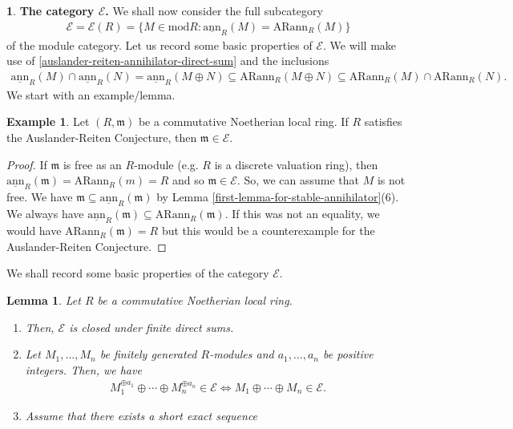 \documentclass[12pt]{amsart}
\newcommand{\sann}{\underline{\mathrm{ann}}}
\newcommand{\arann}{\mathrm{ARann}}
\newcommand{\m}{\mathfrak{m}}
\newcommand{\module}{\mathrm{mod}}
\newcommand{\EE}{\mathcal{E}}
\newtheorem{lemma}[theorem]{Lemma}
\theoremstyle{definition}
\newtheorem{example}[theorem]{Example}
\newtheorem{chunk}[theorem]{}
\numberwithin{equation}{theorem}
\begin{document}
\begin{chunk}
    \textbf{The category $\EE$.} We shall now consider the full subcategory
    \begin{align*}
        \EE = \EE(R) = \{M \in \module R \colon \sann_R(M) = \arann_R(M) \}
    \end{align*}
    of the module category. Let us record some basic properties of $\EE$. We will make use of \ref{auslander-reiten-annihilator-direct-sum} and the inclusions 
    \begin{align}\label{inclusions-direct-sums-stable-annihilator-ar-annihilators}
    \sann_R(M) \cap \sann_R(N) = \sann_R(M \oplus N) \subseteq \arann_R(M \oplus N) \subseteq \arann_R(M) \cap \arann_R(N).
    \end{align}
    We start with an example/lemma.
    \begin{example}
        Let $(R, \m)$ be a commutative Noetherian local ring. If $R$ satisfies the Auslander-Reiten Conjecture, then $\m \in \EE$.
    \end{example}
    \begin{proof}
        If $\m$ is free as an $R$-module (e.g. $R$ is a discrete valuation ring), then $\sann_R(\m) = \arann_R(m) = R$ and so $\m \in \EE$. So, we can assume that $M$ is not free. We have $\m \subseteq \sann_R(\m)$ by Lemma \ref{first-lemma-for-stable-annihilator}(6). We always have $\sann_R(\m) \subseteq \arann_R(\m)$. If this was not an equality, we would have $\arann_R(\m) = R$ but this would be a counterexample for the Auslander-Reiten Conjecture.
    \end{proof}
    We shall record some basic properties of the category $\EE$.
    \begin{lemma}\label{main-direct-sum-lemma}
        Let $R$ be a commutative Noetherian local ring.
        \begin{enumerate}
            \item Then, $\EE$ is closed under finite direct sums.
            \item Let $M_1, \ldots, M_n$ be finitely generated $R$-modules and $a_1, \ldots, a_n$ be positive integers. Then, we have 
            \begin{align*}
                M_1^{\oplus a_1} \oplus \cdots \oplus M_n^{\oplus a_n} \in \EE \iff M_1 \oplus \cdots \oplus M_n \in \EE.
            \end{align*}
            \item Assume that there exists a short exact sequence 
            \begin{align*}

\end{align*}
\end{enumerate}
\end{lemma}
\end{chunk}
\end{document}
